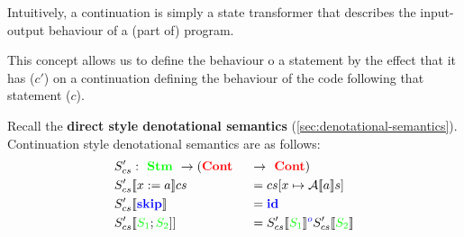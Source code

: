 \documentclass[11pt,a4paper,titlepage,dvipsnames,cmyk]{scrartcl}
\begin{document}
Intuitively, a continuation is simply a state transformer that describes
the input-output behaviour of a (part of) program.

This concept allows us to define the behaviour o a statement  by the
effect that it has ($c'$) on a continuation defining the behaviour of the
code following that statement ($c$).

Recall the \textbf{direct style denotational semantics}
(\ref{sec:denotational-semantics}). Continuation style denotational
semantics are as follows:
\begin{alignat*}{2}
    &S'_{cs} : {\color{green}\textbf{ Stm }} \rightarrow (
    {\color{red}\textbf{Cont }} &&\rightarrow {\color{red}\textbf{ Cont}}) \\
    &S'_{cs} [\![x:=a]\!]c s &&= c s [x \mapsto \mathcal{A}[\![a]\!]s] \\
    &S'_{cs} [\![ {\color{blue}\textbf{skip}}]\!] &&=
    {\color{blue}\textbf{id}} \\
    &S'_{cs}[\![ {\color{green}S_1}; {\color{green}S_2} ]] &&= S'_{cs}[\![
    {\color{green}S_1} ]\!] ^ {\color{blue}o} S'_{cs} [\![
    {\color{green}S_2} ]\!] \\
\end{alignat*}
\end{document}
